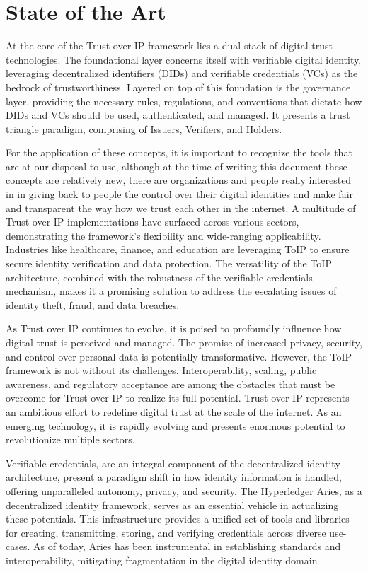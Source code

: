 \section{State of the Art}

At the core of the Trust over IP framework lies a dual stack of digital trust technologies. The foundational layer concerns itself with verifiable digital identity, leveraging decentralized identifiers (DIDs) and verifiable credentials (VCs) as the bedrock of trustworthiness. Layered on top of this foundation is the governance layer, providing the necessary rules, regulations, and conventions that dictate how DIDs and VCs should be used, authenticated, and managed. It presents a trust triangle paradigm, comprising of Issuers, Verifiers, and Holders.

For the application of these concepts, it is important to recognize the tools that are at our disposal to use, although at the time of writing this document these concepts are relatively new, there are organizations and people really interested in in giving back to people the control over their digital identities and make fair and transparent the way how we trust each other in the internet. A multitude of Trust over IP implementations have surfaced across various sectors, demonstrating the framework's flexibility and wide-ranging applicability. Industries like healthcare, finance, and education are leveraging ToIP to ensure secure identity verification and data protection. The versatility of the ToIP architecture, combined with the robustness of the verifiable credentials mechanism, makes it a promising solution to address the escalating issues of identity theft, fraud, and data breaches.

As Trust over IP continues to evolve, it is poised to profoundly influence how digital trust is perceived and managed. The promise of increased privacy, security, and control over personal data is potentially transformative. However, the ToIP framework is not without its challenges. Interoperability, scaling, public awareness, and regulatory acceptance are among the obstacles that must be overcome for Trust over IP to realize its full potential. Trust over IP represents an ambitious effort to redefine digital trust at the scale of the internet. As an emerging technology, it is rapidly evolving and presents enormous potential to revolutionize multiple sectors.

Verifiable credentials, are an integral component of the decentralized identity architecture, present a paradigm shift in how identity information is handled, offering unparalleled autonomy, privacy, and security. The Hyperledger Aries, as a decentralized identity framework, serves as an essential vehicle in actualizing these potentials. This infrastructure provides a unified set of tools and libraries for creating, transmitting, storing, and verifying credentials across diverse use-cases. As of today, Aries has been instrumental in establishing standards and interoperability, mitigating fragmentation in the digital identity domain

